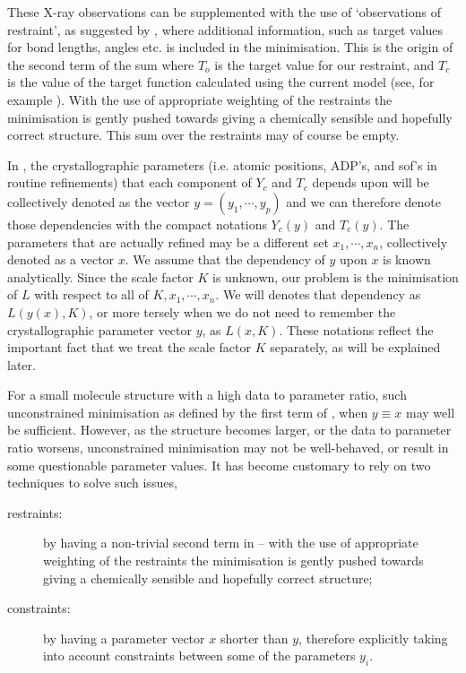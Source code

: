 \documentclass[pdf]{iucr}
\begin{document}
These X-ray observations can be supplemented with the use of `observations of restraint', as suggested by \cite{Waser:a03999}, where additional information, such as target values for bond lengths, angles etc. is included in the minimisation. This is the origin of the second term of the sum where $T_o$ is the target value for our restraint, and $T_c$ is the value of the target function calculated using the current model (see, for example \cite{Giacovazzo:2002,Watkin:kk5025}). With the use of appropriate weighting of the restraints the minimisation is gently pushed towards giving a chemically sensible and hopefully correct structure. This sum over the restraints may of course be empty.

In , the crystallographic parameters (i.e. atomic positions, ADP's, and sof's in routine refinements) that each component of $Y_c$ and $T_c$ depends upon will be collectively denoted as the vector $y=(y_1, \cdots, y_p)$ and we can therefore denote those dependencies with the compact notations $Y_c(y)$ and $T_c(y)$. The parameters that are actually refined may be a different set $x_1, \cdots, x_n$, collectively denoted as a vector $x$. We assume that the dependency of $y$ upon $x$ is known analytically. Since the scale factor $K$ is unknown, our problem is the minimisation of $L$ with respect to all of $K, x_1, \cdots, x_n$. We will  denotes that dependency as $L(y(x), K)$, or more tersely when we do not need to remember the crystallographic parameter vector $y$, as $L(x, K)$. These notations reflect the important fact that we treat the scale factor $K$ separately, as will be explained later.

For a small molecule structure with a high data to parameter ratio, such unconstrained minimisation as defined by the first term of , when $y \equiv x$ may well be sufficient. However, as the structure becomes larger, or the data to parameter ratio worsens, unconstrained minimisation may not be well-behaved, or result in some questionable parameter values. It has become customary to rely on two techniques to solve such issues,
\begin{description}
\item[restraints:] by having a non-trivial second term in  -- with the use of appropriate weighting of the restraints the minimisation is gently pushed towards giving a chemically sensible and hopefully correct structure;
\item[constraints:] by having a parameter vector $x$ shorter than $y$, therefore explicitly taking into account constraints between some of the parameters $y_i$.
\end{description}
\end{document}
